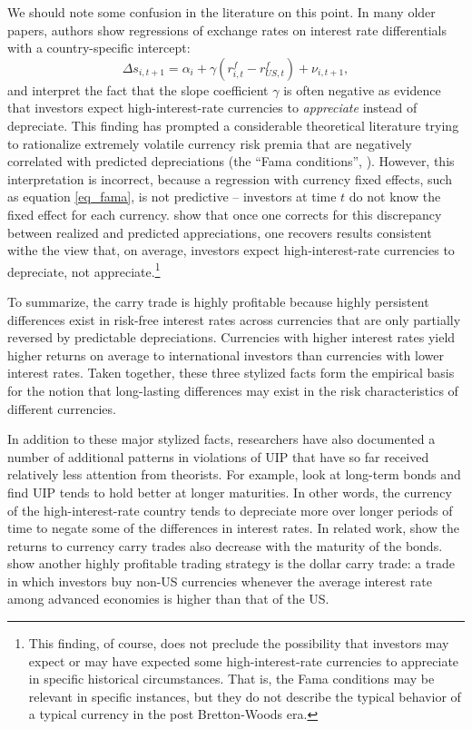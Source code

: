 \documentclass{ar-1col}
\begin{document}
We should note some confusion in the literature on this point. In many older papers, authors show regressions of exchange rates on interest rate differentials with a country-specific intercept:
\begin{equation}
    \Delta s_{i,t+1} 
    = \alpha_i + \gamma \left(r^f_{i, t} - r^f_{US, t}\right) + \nu_{i, t+1},
\label{eq_fama} 
\end{equation}
and interpret the fact that the slope coefficient $\gamma$ is often negative as evidence that investors expect high-interest-rate currencies to \textit{appreciate} instead of depreciate. This finding has prompted a considerable theoretical literature trying to rationalize extremely volatile currency risk premia that are negatively correlated with predicted depreciations (the ``Fama conditions'', \citet{Backusetal2001}). However, this interpretation is incorrect, because a regression with currency fixed effects, such as equation \ref{eq_fama}, is not predictive -- investors at time $t$ do not know the fixed effect for each currency. \citet{HassanMano2019} show that once one corrects for this discrepancy between realized and predicted appreciations, one recovers results consistent withe the view that, on average, investors expect high-interest-rate currencies to depreciate, not appreciate.\footnote{This finding, of course, does not preclude the possibility that investors may expect or may have expected some high-interest-rate currencies to appreciate in specific historical circumstances. That is, the Fama conditions may be relevant in specific instances, but they do not describe the typical behavior of a typical currency in the post Bretton-Woods era.}

To summarize, the carry trade is highly profitable because highly persistent differences exist in risk-free interest rates across currencies that are only partially reversed by predictable depreciations. Currencies with higher interest rates yield higher returns on average to international investors than currencies with lower interest rates. Taken together, these three stylized facts form the empirical basis for the notion that long-lasting differences may exist in the risk characteristics of different currencies.

In addition to these major stylized facts, researchers have also documented a number of additional patterns in violations of UIP that have so far received relatively less attention from theorists. For example, \citet{ChinnMeredith2004} look at long-term bonds and find UIP tends to hold better at longer maturities. In other words, the currency of the high-interest-rate country tends to depreciate more over longer periods of time to negate some of the differences in interest rates. In related work, \citet{LustigStathopoulosVerdelhan2019} show the returns to currency carry trades also decrease with the maturity of the bonds. \citet{LRV2014} show another highly profitable trading strategy is the dollar carry trade: a trade in which investors buy non-US currencies whenever the average interest rate among advanced economies is higher than that of the US. 
\end{document}
